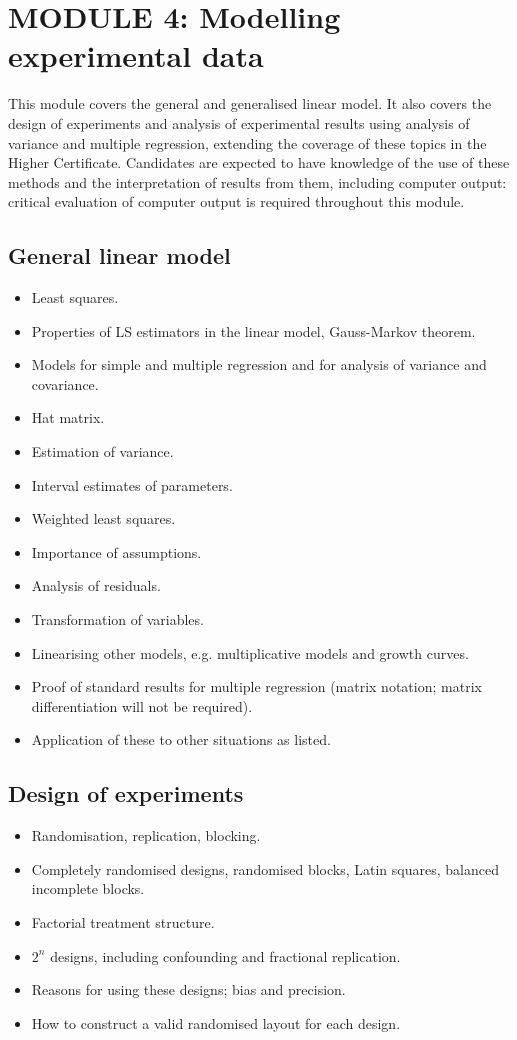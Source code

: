 \section*{MODULE 4: Modelling experimental data}
This module covers the general and generalised linear model. 
It also covers the design of experiments and analysis of experimental results using analysis of variance and multiple regression, extending the coverage of these topics in the Higher Certificate. Candidates are expected to have knowledge of the use of these methods and the interpretation of results from them, including computer output: critical evaluation of computer output is required throughout this module.
\subsection*{General linear model}
\begin{itemize}
\item	Least squares. 
\item	Properties of LS estimators in the linear model, Gauss-Markov theorem. 
\item	Models for simple and multiple regression and for analysis of variance and covariance. 
\item	Hat matrix. 
\item	Estimation of variance. 
\item	Interval estimates of parameters. 
\item	Weighted least squares. 
\item	Importance of assumptions. 
\item	Analysis of residuals. 
\item	Transformation of variables. 
\item	Linearising other models, e.g. multiplicative models and growth curves.
\item	Proof of standard results for multiple regression (matrix notation; matrix differentiation will not be required). 
\item	Application of these to other situations as listed.
\end{itemize}
\subsection*{Design of experiments}
\begin{itemize}
\item	Randomisation, replication, blocking.
\item	Completely randomised designs, randomised blocks, Latin squares, balanced incomplete blocks.
\item	Factorial treatment structure.
\item	$2^n$ designs, including confounding and fractional replication.
\item	Reasons for using these designs; bias and precision. 
\item	How to construct a valid randomised layout for each design. 
\end{itemize}


